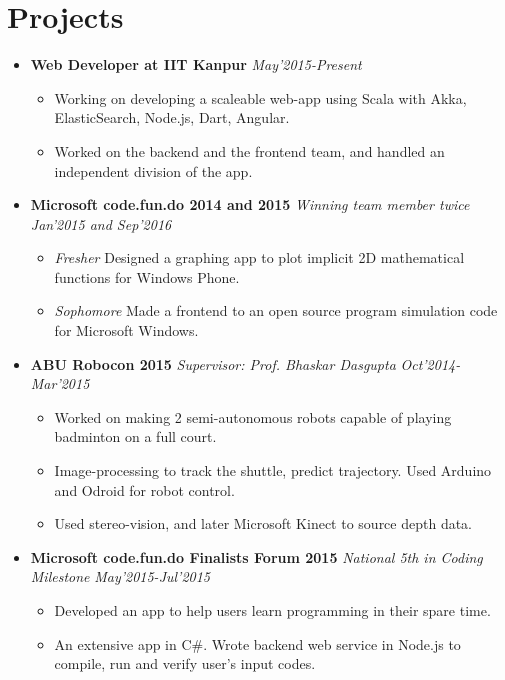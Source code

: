 \documentclass[11pt,a4paper]{article}
\begin{document}
\section*{Projects}
\vspace{-0.2cm}
\begin {itemize}

\item \textbf{\large{Web Developer at IIT Kanpur}} \hfill\textit{May'2015-Present}
  \begin{itemize}[leftmargin=*]
    \setlength \itemsep{0em}
    \item Working on developing a scaleable web-app using Scala with Akka, ElasticSearch, Node.js, Dart, Angular. 
    \item Worked on the backend and the frontend team, and handled an independent division of the app.
  \end{itemize}

\vspace{0.1cm}
\item \textbf{\large{Microsoft code.fun.do 2014 and 2015}} \emph{Winning team member twice} \hfill\textit{ Jan'2015 and Sep'2016}
  \begin{itemize}[leftmargin=*]
    \setlength \itemsep{0em}
    \item \textit{Fresher} Designed a graphing app to plot implicit 2D mathematical functions for Windows Phone.
    \item \textit{Sophomore} Made a frontend to an open source program simulation code for Microsoft Windows.
    \end{itemize}

\vspace{0.1cm}
\item \textbf{\large{ABU Robocon 2015}} \emph{Supervisor: Prof. Bhaskar Dasgupta} \hfill\textit{ Oct'2014-Mar'2015}
  \begin{itemize}[leftmargin=*]
    \setlength \itemsep{0em}
    \item Worked on making 2 semi-autonomous robots capable of playing badminton on a full court.
    \item Image-processing to track the shuttle, predict trajectory. Used Arduino and Odroid for robot control.
    \item Used stereo-vision, and later Microsoft Kinect to source depth data.
    \end{itemize}

\vspace{0.1cm}
\item \textbf{\large{Microsoft code.fun.do Finalists Forum 2015}} \emph{National 5th in Coding Milestone} \hfill\textit{ May'2015-Jul'2015}
  \begin{itemize}[leftmargin=*]
    \setlength \itemsep{0em}
    \item Developed an app to help users learn programming in their spare time.
    \item An extensive app in C\#. Wrote backend web service in Node.js to compile, run and verify user's input codes.
    \end{itemize}
\end{itemize}
\end{document}
